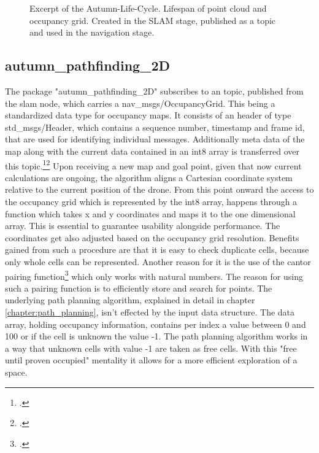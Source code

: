 \begin{figure}[h]
	\centering
	
	\caption{Excerpt of the Autumn-Life-Cycle. Lifespan of point cloud and occupancy grid. Created in the SLAM stage, published as a topic and used in the navigation stage.}
	\label{fig:abstract_environments_enviromentTransfer}
\end{figure}

\subsection{autumn\_pathfinding\_2D}
The package "autumn\_pathfinding\_2D" subscribes to an topic, published from the slam node, which carries a nav\_msgs/OccupancyGrid. This being a standardized data type for occupancy maps. It consists of an header of type std\_msgs/Header, which contains a sequence number, timestamp and frame id, that are used for identifying individual messages. Additionally meta data of the map along with the current data contained in an int8 array is transferred over this topic.\footcite{rosNavMsgsOccupancyGrid2021}\footcite{rosStdMsgsHeader2021}\newline
Upon receiving a new map and goal point, given that now current calculations are ongoing, the algorithm aligns a Cartesian coordinate system relative to the current position of the drone. From this point onward the access to the occupancy grid which is represented by the int8 array, happens through a function which takes x and y coordinates and maps it to the one dimensional array. This is essential to guarantee usability alongside performance.\newline
The coordinates get also adjusted based on the occupancy grid resolution. Benefits gained from such a procedure are that it is easy to check duplicate cells, because only whole cells can be represented. Another reason for it is the use of the cantor pairing function\footcite{Szudzik2017} which only works with natural numbers. The reason for using such a pairing function is to efficiently store and search for points.  
The underlying path planning algorithm, explained in detail in chapter \ref{chapter:path_planning}, isn't effected by the input data structure.       
The data array, holding occupancy information, contains per index a value between 0 and 100 or if the cell is unknown the value -1. The path planning algorithm works in a way that unknown cells with value -1 are taken as free cells. With this "free until proven occupied" mentality it allows for a more efficient exploration of a space.

